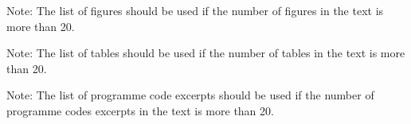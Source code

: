 \documentclass[11pt,a4paper]{report}
\let\openright=\clearpage
\begin{document}


\setcounter{tocdepth}{2}
\tableofcontents

\openright
\listoffigures

Note: The list of figures should be used if the number of figures in the text is more than 20.

\clearpage
\listoftables

Note: The list of tables should be used if the number of tables in the text is more than 20.  

\clearpage
\lstlistoflistings
Note: The list of programme code excerpts should be used if the number of programme codes excerpts in the text is more than 20.





{%
\pagestyle{plain}
%
}


%
%
%
% 
% 

{%
\pagestyle{fancyx}




}

{%
\pagestyle{plain}

}



\part*{\Prilohy\thispagestyle{empty}}
\appendix




\end{document}
